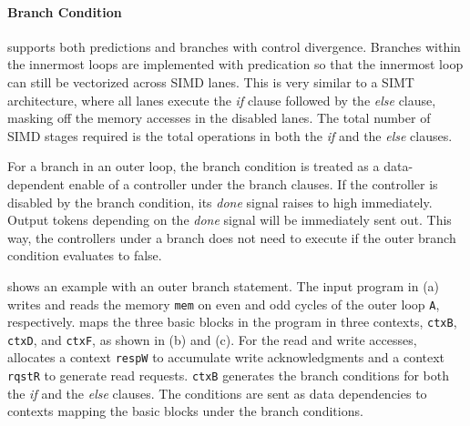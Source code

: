 \paragraph{Branch Condition}
\name supports both predictions and branches with control divergence.
Branches within the innermost loops are implemented with predication so that the innermost loop can still be
vectorized across SIMD lanes.
This is very similar to a SIMT architecture, where all lanes execute the \emph{if} clause followed
by the \emph{else} clause, masking off the memory accesses in the disabled lanes.
The total number of SIMD stages required is the total operations in both the \emph{if} and the \emph{else} clauses.

For a branch in an outer loop,
the branch condition is treated as a data-dependent enable of a controller under the branch clauses.
If the controller is disabled by the branch condition, its \emph{done} signal raises to high immediately.
Output tokens depending on the {\em done} signal will be immediately sent out.
This way, the controllers under a branch does not need to execute if the outer branch condition
evaluates to false.

 shows an example with an outer branch statement.
The input program in (a) writes and reads the memory \texttt{mem} on even and odd cycles of
the outer loop \texttt{A}, respectively. 
\name maps the three basic blocks in the program in three
contexts, \texttt{ctxB}, \texttt{ctxD}, and \texttt{ctxF}, as shown in (b) and (c). 
For the read and write accesses, \name
allocates a context \texttt{respW} to accumulate write acknowledgments and a context \texttt{rqstR} 
to generate read requests. 
\texttt{ctxB} generates the branch conditions for both the \emph{if} and the \emph{else} clauses.
The conditions are sent as data dependencies to contexts mapping the basic blocks under the branch conditions.

